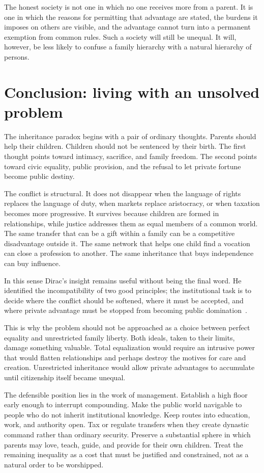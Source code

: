 ﻿\documentclass[12pt,a4paper]{book}
\begin{document}
The honest society is not one in which no one receives more from a parent.
It is one in which the reasons for permitting that advantage are stated,
the burdens it imposes on others are visible, and the advantage cannot turn
into a permanent exemption from common rules.  Such a society will still be
unequal.  It will, however, be less likely to confuse a family hierarchy
with a natural hierarchy of persons.

\section{Conclusion: living with an unsolved problem}

The inheritance paradox begins with a pair of ordinary thoughts.  Parents
should help their children.  Children should not be sentenced by their
birth.  The first thought points toward intimacy, sacrifice, and family
freedom.  The second points toward civic equality, public provision, and
the refusal to let private fortune become public destiny.

The conflict is structural.  It does not disappear when the language of
rights replaces the language of duty, when markets replace aristocracy, or
when taxation becomes more progressive.  It survives because children are
formed in relationships, while justice addresses them as equal members of a
common world.  The same transfer that can be a gift within a family can be a
competitive disadvantage outside it.  The same network that helps one child
find a vocation can close a profession to another.  The same inheritance
that buys independence can buy influence.

In this sense Dirac's insight remains useful without being the final word.
He identified the incompatibility of two good principles; the institutional
task is to decide where the conflict should be softened, where it must be
accepted, and where private advantage must be stopped from becoming public
domination~\cite{dirac-81}.

This is why the problem should not be approached as a choice between
perfect equality and unrestricted family liberty.  Both ideals, taken to
their limits, damage something valuable.  Total equalization would require
an intrusive power that would flatten relationships and perhaps destroy the
motives for care and creation.  Unrestricted inheritance would allow
private advantages to accumulate until citizenship itself became unequal.

The defensible position lies in the work of management.  Establish a high
floor early enough to interrupt compounding.  Make the public world
navigable to people who do not inherit institutional knowledge.  Keep routes
into education, work, and authority open.  Tax or regulate transfers when
they create dynastic command rather than ordinary security.  Preserve a
substantial sphere in which parents may love, teach, guide, and provide for
their own children.  Treat the remaining inequality as a cost that must be
justified and constrained, not as a natural order to be worshipped.
\end{document}
